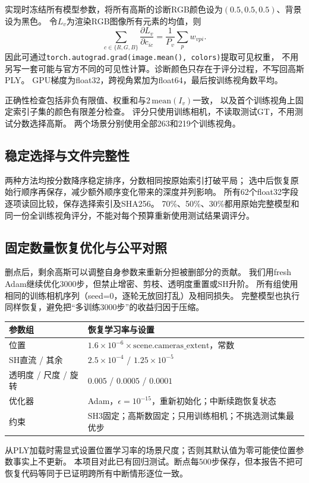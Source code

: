 \documentclass[UTF8,fontset=fandol,zihao=-4,a4paper]{ctexart}
\begin{document}
实现时冻结所有模型参数，将所有高斯的诊断RGB颜色设为$(0.5,0.5,0.5)$、背景设为黑色。
令$L_v$为渲染RGB图像所有元素的均值，则
\begin{equation}\sum_{c\in\{R,G,B\}}\frac{\partial L_v}{\partial c_{ic}}
=\frac{1}{P_v}\sum_p w_{vpi}.\end{equation}
因此可通过\texttt{torch.autograd.grad(image.mean(), colors)}提取可见权重，
不用另写一套可能与官方不同的可见性计算。诊断颜色只存在于评分过程，不写回高斯PLY。
GPU梯度为float32，跨视角累加为float64，最后按训练视角数平均。

正确性检查包括非负有限值、权重和与$2\,\mathrm{mean}(I_v)$一致，
以及首个训练视角上固定索引子集的颜色有限差分检查。
评分只使用训练相机，不读取测试GT，不用测试分数选择高斯。
两个场景分别使用全部263和219个训练视角。

\subsection{稳定选择与文件完整性}
两种方法均按分数降序稳定排序，分数相同按原始索引打破平局；
选中后恢复原始行顺序再保存，减少额外顺序变化带来的深度并列影响。
所有62个float32字段逐项读回比较，保存选择索引及SHA256。
70\%、50\%、30\%都用原始完整模型和同一份全训练视角评分，不能对每个预算重新使用测试结果调评分。

\subsection{固定数量恢复优化与公平对照}
删点后，剩余高斯可以调整自身参数来重新分担被删部分的贡献。
我们用fresh Adam继续优化3000步，但禁止增密、剪枝、透明度重置或SH升阶。
所有组使用相同的训练相机序列（seed=0，逐轮无放回打乱）及相同损失。
完整模型也执行同样恢复，避免把“多训练3000步”的收益归因于压缩。

\begin{center}\small
\begin{tabular}{ll}\toprule
参数组 & 恢复学习率与设置 \\\midrule
位置 & $1.6\times10^{-6}\times\mathrm{scene.cameras\_extent}$，常数 \\
SH直流 / 其余 & $2.5\times10^{-4}$ / $1.25\times10^{-5}$ \\
透明度 / 尺度 / 旋转 & $0.005$ / $0.0005$ / $0.0001$ \\
优化器 & Adam，$\epsilon=10^{-15}$，重新初始化；中断续跑恢复状态 \\
约束 & SH3固定；高斯数固定；只用训练相机；不挑选测试集最优步 \\\bottomrule
\end{tabular}\end{center}
从PLY加载时需显式设置位置学习率的场景尺度；否则其默认值为零可能使位置参数事实上不更新。
本项目对此已有回归测试。断点每500步保存，但本报告不把可恢复代码等同于已证明跨所有中断情形逐位一致。
\end{document}

